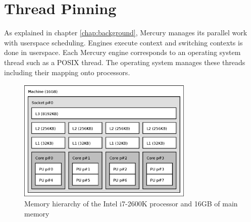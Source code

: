 
\section{Thread Pinning}
\label{sec:rts_thread_pinning}


As explained in chapter \ref{chap:background},
Mercury manages its parallel work with userspace scheduling.
Engines execute context and switching contexts is done in userspace.
Each Mercury engine corresponds to an operating system thread such as a
POSIX thread.
The operating system manages these threads including their mapping onto
processors.

\begin{figure}
\begin{center}
\includegraphics[width=0.75\textwidth]{i7-hierarchy}
\end{center}
\caption{Memory hierarchy of the Intel i7-2600K processor and 16GB of main
memory}
\label{fig:i7_hierarchy}
\end{figure}

